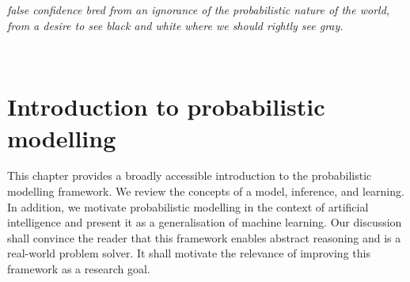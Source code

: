 \thispagestyle{empty}
\section*{}


\vfill

{
\textit{ false confidence bred from an ignorance of the probabilistic nature of the world, from a desire to see black and white where we should rightly see gray.}

  \par\bigskip
  \\
  \par%
}

\vfill

\chapter{Introduction to probabilistic modelling}\label{ch:02A}

\begin{chapter_outline}

  This chapter provides a broadly accessible introduction to the probabilistic modelling framework.
  We review the concepts of a model, inference, and learning. In addition, we motivate probabilistic modelling in the context of artificial intelligence and present it as a generalisation of machine learning. Our discussion shall convince the reader that this framework enables abstract reasoning and is a real-world problem solver. It shall motivate the relevance of improving this framework as a research goal.
\end{chapter_outline}

